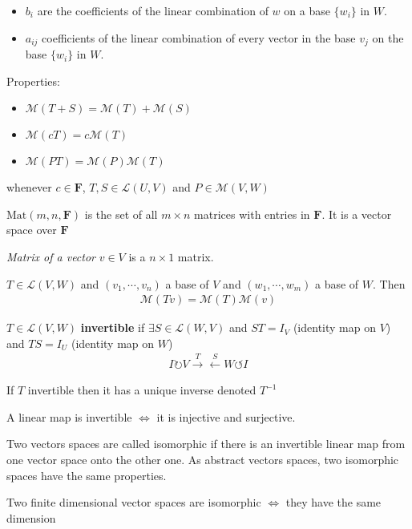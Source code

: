 \documentclass[11pt,notitlepage,oneside]{article}
\begin{document}
\begin{description}
\begin{itemize}
  \item $b_i$ are the coefficients of the linear combination of $w$ on a base $\{w_i\}$ in $W$.
  \item $a_{ij}$ coefficients of the linear combination of every vector in the base $v_j$ on the base $\{w_i\}$ in $W$.
  \end{itemize}
  Properties:
  \begin{itemize}
  \item $\mathcal{M}(T+S) = \mathcal{M}(T) + \mathcal{M}(S)$
  \item $\mathcal{M}(cT) = c\mathcal{M}(T)$
  \item $\mathcal{M}(PT) = \mathcal{M}(P)\mathcal{M}(T)$
  \end{itemize}
  whenever $c\in\mathbf{F}$, $T,S\in\mathcal{L}(U,V)$ and  $P\in\mathcal{M}(V,W)$
  \item $\mathrm{Mat}(m,n,\mathbf{F})$ is the set of all $m\times n$ matrices with entries in $\mathbf{F}$. It is a vector space over $\mathbf{F}$
  \item \emph{Matrix of a vector} $v\in V$ is a $n\times 1$ matrix.
  \item[P14] $T\in\mathcal{L}(V,W)$ and $(v_1,\cdots,v_n)$ a base of $V$ and $(w_1,\cdots,w_m)$ a base of $W$. Then
  \begin{align*}
  \mathcal{M}(Tv) =\mathcal{M}(T)\mathcal{M}(v) 
  \end{align*}
  \item[Invertibility\label{itm:D3_invertible_operator}] $T\in\mathcal{L}(V,W)$ \textbf{invertible} if $\exists S\in\mathcal{L}(W,V)$ and $ST=I_V$ (identity map on $V$) and $TS=I_U$ (identity map on $W$) 
  \begin{align*}
  I \circlearrowright V \xrightarrow{T}\xleftarrow{S} W \circlearrowleft I
  \end{align*}
  \item If $T$ invertible then it has a unique inverse denoted $T^{-1}$ 
  \item[P17] A linear map is invertible $\iff$ it is injective and surjective.
  
  \item[Isomorphic] Two vectors spaces are called isomorphic if there is an invertible linear map from one vector space onto the other one. As abstract vectors spaces, two isomorphic spaces have the same properties.
  
  \item[T18] Two finite dimensional vector spaces are isomorphic $\iff$ they have the same dimension
  

\end{description}
\end{document}
